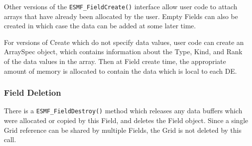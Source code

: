 Other versions of the {\tt ESMF\_FieldCreate()} interface
allow user code to attach arrays that have already been
allocated by the user.  Empty Fields can also be created in
which case the data can be added at some later time.

For versions of Create which do not specify data values,
user code can create an ArraySpec object, which
contains information about the Type, Kind, and Rank of the
data values in the array.  Then at Field create time, the
appropriate amount of memory is allocated to contain the
data which is local to each DE.

\subsubsection{Field Deletion}

There is a {\tt ESMF\_FieldDestroy()} method which releases
any data buffers which were allocated or copied by this Field,
and deletes the Field object.  Since a single Grid reference 
can be shared by multiple Fields, the Grid is not deleted by 
this call.
